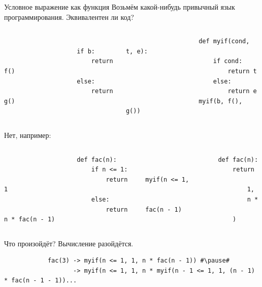 
    \begin{frame}[fragile]{Условное выражение как функция}
        Возьмём какой-нибудь привычный язык программирования.
        Эквивалентен ли код?
        \vspace{-1em}
        \begin{columns}[onlytextwidth]
            \begin{column}[t]{0.485\textwidth}
                \begin{verbatim}

                    if b:
                        return f()
                    else:
                        return g()
                \end{verbatim}
            \end{column}\hfill%
            \begin{column}[t]{0.485\textwidth}
                \begin{verbatim}
                    def myif(cond, t, e):
                        if cond:
                            return t
                        else:
                            return e
                    myif(b, f(), g())
                \end{verbatim}
            \end{column}
        \end{columns}
        \pause
        Нет, например:
        \vspace{-1em}
        \begin{columns}[onlytextwidth]
            \begin{column}[t]{0.485\textwidth}
                \begin{verbatim}
                    def fac(n):
                        if n <= 1:
                            return 1
                        else:
                            return n * fac(n - 1)
                \end{verbatim}
            \end{column}\hfill%
            \begin{column}[t]{0.485\textwidth}
                \begin{verbatim}
                    def fac(n):
                        return myif(n <= 1,
                            1,
                            n * fac(n - 1)
                        )
                \end{verbatim}
            \end{column}
        \end{columns}
        \vspace{1em}
        Что произойдёт? \pause Вычисление разойдётся.
        \begin{verbatim}
            fac(3) -> myif(n <= 1, 1, n * fac(n - 1)) #\pause#
                   -> myif(n <= 1, 1, n * myif(n - 1 <= 1, 1, (n - 1) * fac(n - 1 - 1))...
        \end{verbatim}
    \end{frame}

